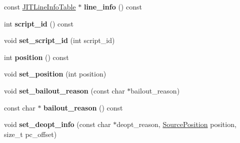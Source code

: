 \begin{DoxyCompactItemize}
\item 
const \hyperlink{classv8_1_1internal_1_1_j_i_t_line_info_table}{J\+I\+T\+Line\+Info\+Table} $\ast$ {\bfseries line\+\_\+info} () const \hypertarget{classv8_1_1internal_1_1_code_entry_a897a4008e17904a24f93010fb6cbe46e}{}\label{classv8_1_1internal_1_1_code_entry_a897a4008e17904a24f93010fb6cbe46e}

\item 
int {\bfseries script\+\_\+id} () const \hypertarget{classv8_1_1internal_1_1_code_entry_aa218e865e0ce407f5a23b0da8bbf8882}{}\label{classv8_1_1internal_1_1_code_entry_aa218e865e0ce407f5a23b0da8bbf8882}

\item 
void {\bfseries set\+\_\+script\+\_\+id} (int script\+\_\+id)\hypertarget{classv8_1_1internal_1_1_code_entry_a52937aac42b99caaa1f5956706a6565c}{}\label{classv8_1_1internal_1_1_code_entry_a52937aac42b99caaa1f5956706a6565c}

\item 
int {\bfseries position} () const \hypertarget{classv8_1_1internal_1_1_code_entry_a2c6e7840a8010bb5ad39fad225ac8a3d}{}\label{classv8_1_1internal_1_1_code_entry_a2c6e7840a8010bb5ad39fad225ac8a3d}

\item 
void {\bfseries set\+\_\+position} (int position)\hypertarget{classv8_1_1internal_1_1_code_entry_a80a9e85cbb2d54e7ed6bee8184d014d0}{}\label{classv8_1_1internal_1_1_code_entry_a80a9e85cbb2d54e7ed6bee8184d014d0}

\item 
void {\bfseries set\+\_\+bailout\+\_\+reason} (const char $\ast$bailout\+\_\+reason)\hypertarget{classv8_1_1internal_1_1_code_entry_a6c5b09de8c11f72b63c95f086bddb489}{}\label{classv8_1_1internal_1_1_code_entry_a6c5b09de8c11f72b63c95f086bddb489}

\item 
const char $\ast$ {\bfseries bailout\+\_\+reason} () const \hypertarget{classv8_1_1internal_1_1_code_entry_a07e1931379626282df827e4a31bd337a}{}\label{classv8_1_1internal_1_1_code_entry_a07e1931379626282df827e4a31bd337a}

\item 
void {\bfseries set\+\_\+deopt\+\_\+info} (const char $\ast$deopt\+\_\+reason, \hyperlink{classv8_1_1internal_1_1_source_position}{Source\+Position} position, size\+\_\+t pc\+\_\+offset)\hypertarget{classv8_1_1internal_1_1_code_entry_a9205bbe89d123fcb0f3aab305202f157}{}\label{classv8_1_1internal_1_1_code_entry_a9205bbe89d123fcb0f3aab305202f157}


\end{DoxyCompactItemize}
